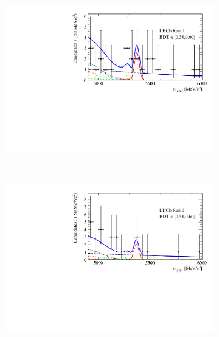 {{\begin{figure}[tbp]
\begin{subfigure}[b]{0.48\textwidth}
        \includegraphics[width=\textwidth]{./Figs/BFAnalysis/Fig17c.pdf}
    \end{subfigure}
    ~ %
    \begin{subfigure}[b]{0.48\textwidth}
       \includegraphics[width=\textwidth]{./Figs/BFAnalysis/Fig17g.pdf}
    \end{subfigure}
    \begin{subfigure}[b]{0.48\textwidth}

\end{subfigure}
\end{figure}}}
